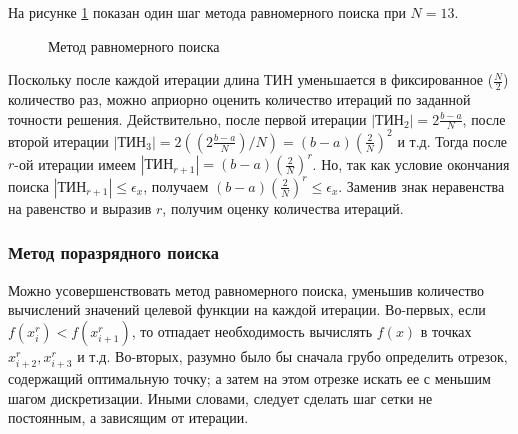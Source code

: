 \documentclass[a4paper,12pt]{report}
\begin{document}
На рисунке \ref{fig:uniform_search} показан один шаг метода равномерного поиска при $N = 13$.

\begin{figure}[ht]
\caption{Метод равномерного поиска}
\label{fig:uniform_search}
\end{figure}

Поскольку после каждой итерации длина ТИН уменьшается в фиксированное ($\frac{N}{2}$) количество раз, можно априорно оценить количество итераций по заданной точности решения. Действительно, после первой итерации $\left|\text{ТИН}_{2}\right| = 2\frac{b-a}{N}$, после второй итерации $\left|\text{ТИН}_{3}\right| = 2((2\frac{b-a}{N})/N) = (b-a)(\frac{2}{N})^{2}$ и т.д. Тогда после $r$-ой итерации имеем $\left|\text{ТИН}_{r+1}\right| = (b-a)(\frac{2}{N})^{r}$. Но, так как условие окончания поиска $\left|\text{ТИН}_{r+1}\right| \leq \epsilon_{x}$, получаем $(b-a)(\frac{2}{N})^{r} \leq \epsilon_{x}$. Заменив знак неравенства на равенство и выразив $r$, получим оценку количества итераций.

\subsubsection{Метод поразрядного поиска}
Можно усовершенствовать метод равномерного поиска, уменьшив количество вычислений значений целевой функции на каждой итерации. Во-первых, если $f(x^{r}_{i}) < f(x^{r}_{i+1})$, то отпадает необходимость вычислять $f(x)$ в точках $x^{r}_{i+2}, x^{r}_{i+3}$ и т.д. Во-вторых, разумно было бы сначала грубо определить отрезок, содержащий оптимальную точку; а затем на этом отрезке искать ее с меньшим шагом дискретизации. Иными словами, следует сделать шаг сетки не постоянным, а зависящим от итерации.
\end{document}
